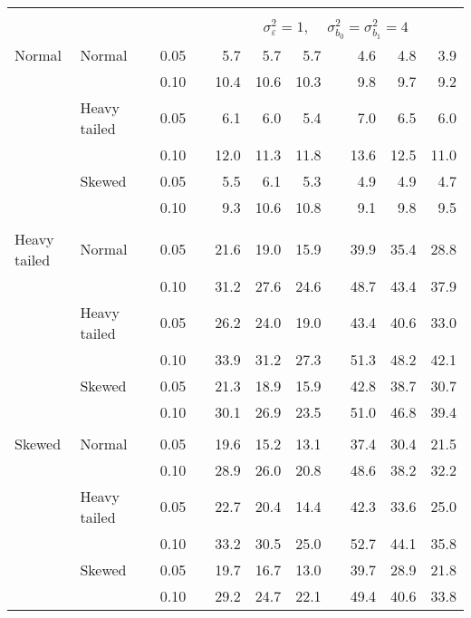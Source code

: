 \begin{table}[ht]
\begin{scriptsize}
\begin{center}
\begin{tabular}{ll p{.1cm} c p{.1cm} rrr p{.1cm} rrr}
&&&&&&&&&&&\\
& && && \multicolumn{7}{c}{$\sigma_{\varepsilon}^2 = 1$, \ \ $\sigma_{b_0}^2 = \sigma_{b_1}^2 = 4$} \\ \cline{6-12}
\rowcolor{gray!20}Normal       & Normal       && 0.05 &&   5.7 & 5.7 & 5.7 &   & 4.6 & 4.8 & 3.9 \\ 
\rowcolor{gray!20}             &              && 0.10 &&   10.4 & 10.6 & 10.3 &   & 9.8 & 9.7 & 9.2 \\ 
\rowcolor{gray!20}             & Heavy tailed && 0.05 &&   6.1 & 6.0 & 5.4 &   & 7.0 & 6.5 & 6.0 \\ 
\rowcolor{gray!20}             &              && 0.10 &&   12.0 & 11.3 & 11.8 &   & 13.6 & 12.5 & 11.0 \\ 
\rowcolor{gray!20}             & Skewed       && 0.05 &&   5.5 & 6.1 & 5.3 &   & 4.9 & 4.9 & 4.7 \\ 
\rowcolor{gray!20}             &              && 0.10 &&   9.3 & 10.6 & 10.8 &   & 9.1 & 9.8 & 9.5 \\ 
&&&&&&&&&&&\\
Heavy tailed & Normal       && 0.05 &&   21.6 & 19.0 & 15.9 &   & 39.9 & 35.4 & 28.8 \\ 
             &              && 0.10 &&   31.2 & 27.6 & 24.6 &   & 48.7 & 43.4 & 37.9 \\ 
             & Heavy tailed && 0.05 &&   26.2 & 24.0 & 19.0 &   & 43.4 & 40.6 & 33.0 \\ 
             &              && 0.10 &&   33.9 & 31.2 & 27.3 &   & 51.3 & 48.2 & 42.1 \\ 
             & Skewed       && 0.05 &&   21.3 & 18.9 & 15.9 &   & 42.8 & 38.7 & 30.7 \\ 
             &              && 0.10 &&   30.1 & 26.9 & 23.5 &   & 51.0 & 46.8 & 39.4 \\ 
&&&&&&&&&&&\\
Skewed       & Normal       && 0.05 &&   19.6 & 15.2 & 13.1 &   & 37.4 & 30.4 & 21.5 \\ 
             &              && 0.10 &&   28.9 & 26.0 & 20.8 &   & 48.6 & 38.2 & 32.2 \\ 
             & Heavy tailed && 0.05 &&   22.7 & 20.4 & 14.4 &   & 42.3 & 33.6 & 25.0 \\ 
             &              && 0.10 &&   33.2 & 30.5 & 25.0 &   & 52.7 & 44.1 & 35.8 \\ 
             & Skewed       && 0.05 &&   19.7 & 16.7 & 13.0 &   & 39.7 & 28.9 & 21.8 \\ 
             &              && 0.10 &&   29.2 & 24.7 & 22.1 &   & 49.4 & 40.6 & 33.8 \\ 

\hline
\end{tabular}
\end{center}
\end{scriptsize}
\end{table}

